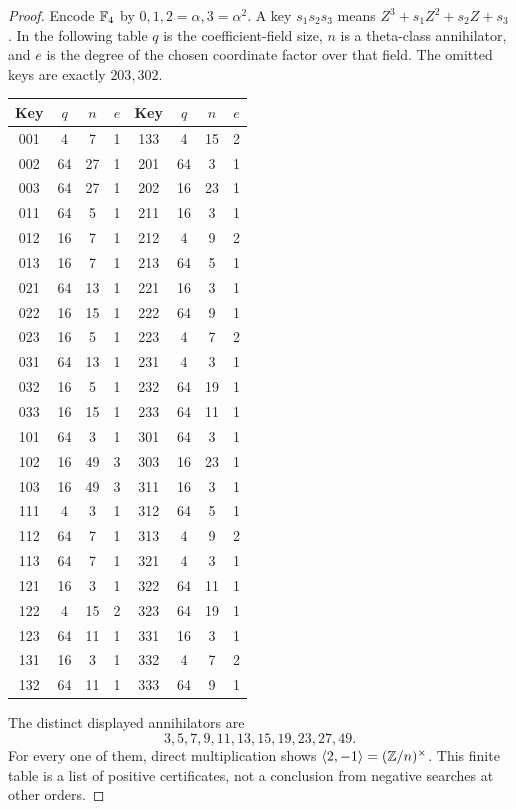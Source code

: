 \begin{proof}
Encode $\mathbb F_4$ by $0,1,2=\alpha,3=\alpha^2$.
A key $s_1s_2s_3$ means $Z^3+s_1Z^2+s_2Z+s_3$.
In the following table $q$ is the coefficient-field
size, $n$ is a theta-class annihilator, and $e$
is the degree of the chosen coordinate factor
over that field. The omitted keys are exactly
$203,302$.
\begin{center}
\begin{tabular}{cccc@{\qquad}cccc}
\toprule
Key & $q$ & $n$ & $e$ & Key & $q$ & $n$ & $e$\\
\midrule
001 & 4 & 7 & 1 & 133 & 4 & 15 & 2\\
002 & 64 & 27 & 1 & 201 & 64 & 3 & 1\\
003 & 64 & 27 & 1 & 202 & 16 & 23 & 1\\
011 & 64 & 5 & 1 & 211 & 16 & 3 & 1\\
012 & 16 & 7 & 1 & 212 & 4 & 9 & 2\\
013 & 16 & 7 & 1 & 213 & 64 & 5 & 1\\
021 & 64 & 13 & 1 & 221 & 16 & 3 & 1\\
022 & 16 & 15 & 1 & 222 & 64 & 9 & 1\\
023 & 16 & 5 & 1 & 223 & 4 & 7 & 2\\
031 & 64 & 13 & 1 & 231 & 4 & 3 & 1\\
032 & 16 & 5 & 1 & 232 & 64 & 19 & 1\\
033 & 16 & 15 & 1 & 233 & 64 & 11 & 1\\
101 & 64 & 3 & 1 & 301 & 64 & 3 & 1\\
102 & 16 & 49 & 3 & 303 & 16 & 23 & 1\\
103 & 16 & 49 & 3 & 311 & 16 & 3 & 1\\
111 & 4 & 3 & 1 & 312 & 64 & 5 & 1\\
112 & 64 & 7 & 1 & 313 & 4 & 9 & 2\\
113 & 64 & 7 & 1 & 321 & 4 & 3 & 1\\
121 & 16 & 3 & 1 & 322 & 64 & 11 & 1\\
122 & 4 & 15 & 2 & 323 & 64 & 19 & 1\\
123 & 64 & 11 & 1 & 331 & 16 & 3 & 1\\
131 & 16 & 3 & 1 & 332 & 4 & 7 & 2\\
132 & 64 & 11 & 1 & 333 & 64 & 9 & 1\\
\bottomrule
\end{tabular}
\end{center}
The distinct displayed annihilators are
\[
                  3,5,7,9,11,13,15,19,23,27,49.
\]
For every one of them, direct multiplication
shows $\langle2,-1\rangle=(\mathbb Z/n)^\times$.
This finite table is a list of positive
certificates, not a conclusion from negative
searches at other orders.


\end{proof}
